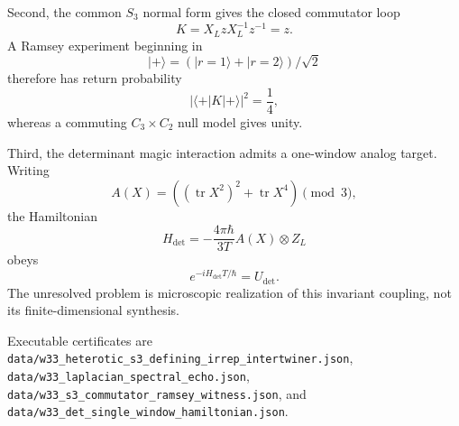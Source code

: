 Second, the common \(S_3\) normal form gives the closed commutator loop
\[
K=X_LzX_L^{-1}z^{-1}=z.
\]
A Ramsey experiment beginning in
\[
|+\rangle=(|r=1\rangle+|r=2\rangle)/\sqrt2
\]
therefore has return probability
\[
|\langle+|K|+\rangle|^2=\frac14,
\]
whereas a commuting \(C_3\times C_2\) null model gives unity.

Third, the determinant magic interaction admits a one-window analog target.
Writing
\[
A(X)=((\operatorname{tr}X^2)^2+\operatorname{tr}X^4)\pmod3,
\]
the Hamiltonian
\[
H_{\det}=-\frac{4\pi\hbar}{3T}A(X)\otimes Z_L
\]
obeys
\[
e^{-iH_{\det}T/\hbar}=U_{\det}.
\]
The unresolved problem is microscopic realization of this invariant coupling,
not its finite-dimensional synthesis.

Executable certificates are
\texttt{data/w33\_heterotic\_s3\_defining\_irrep\_intertwiner.json},
\texttt{data/w33\_laplacian\_spectral\_echo.json},
\texttt{data/w33\_s3\_commutator\_ramsey\_witness.json}, and
\texttt{data/w33\_det\_single\_window\_hamiltonian.json}.
